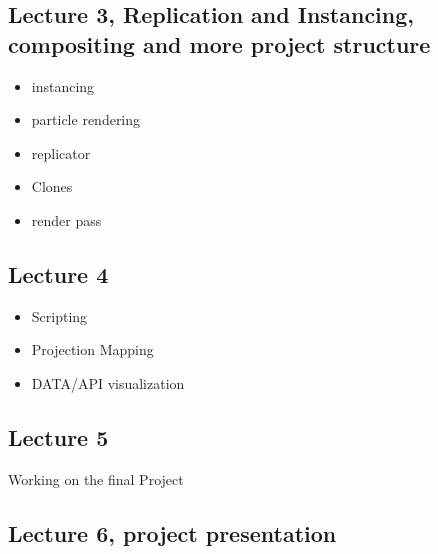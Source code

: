 \subsection{Lecture 3, Replication and Instancing, compositing and more project structure}
\label{sub:lecture_3}
\begin{itemize}
	\item instancing
	\item particle rendering
	\item replicator \COMP
	\item Clones
	\item render pass \TOP
\end{itemize}

\subsection{Lecture 4}
\label{sub:lecture_4}
\begin{itemize}
	\item Scripting
	\item Projection Mapping
	\item DATA/API visualization
\end{itemize}


\subsection{Lecture 5}
\label{sub:lecture_5}
Working on the final Project

\subsection{Lecture 6, project presentation}
\label{sub:lecture_6}


